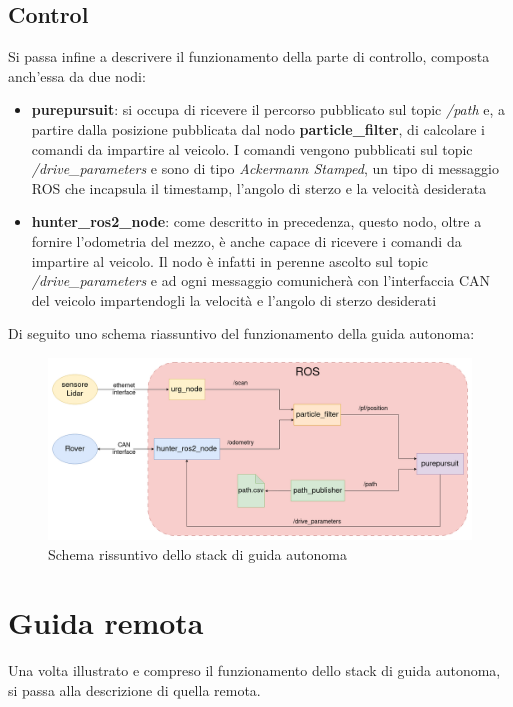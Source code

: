 \subsection{Control}
\noindent Si passa infine a descrivere il funzionamento della parte di controllo, composta anch'essa da due nodi:

\begin{itemize}
  \item \textbf{purepursuit}: si occupa di ricevere il percorso pubblicato sul topic \textit{/path} e, a partire dalla posizione pubblicata dal nodo \textbf{particle\_filter}, di calcolare i comandi da impartire al veicolo. I comandi vengono pubblicati sul topic \textit{/drive\_parameters} e sono di tipo \textit{Ackermann Stamped}, un tipo di messaggio ROS che incapsula il timestamp, l'angolo di sterzo e la velocità desiderata
  \item \textbf{hunter\_ros2\_node}: come descritto in precedenza, questo nodo, oltre a fornire l'odometria del mezzo, è anche capace di ricevere i comandi da impartire al veicolo. Il nodo è infatti in perenne ascolto sul topic \textit{/drive\_parameters} e ad ogni messaggio comunicherà con l'interfaccia CAN del veicolo impartendogli la velocità e l'angolo di sterzo desiderati
\end{itemize}

\noindent Di seguito uno schema riassuntivo del funzionamento della guida autonoma:
\begin{figure}[h]
  \centering
  \includegraphics[width=1\textwidth]{figures/schema_guida_autonoma.png}
  \caption{Schema rissuntivo dello stack di guida autonoma}
  \label{Schema rissuntivo dello stack di guida autonoma}
\end{figure}

\section{Guida remota}
Una volta illustrato e compreso il funzionamento dello stack di guida autonoma, si passa alla descrizione di quella remota.

